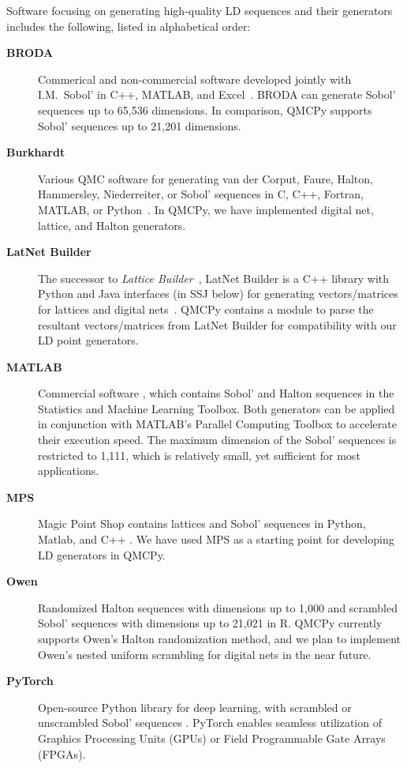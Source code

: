 \documentclass[graybox]{svmult}
\begin{document}
Software focusing on generating high-quality LD sequences and their generators includes the following, listed in alphabetical order:
\begin{description}%
	\item[\textbf{BRODA}] \sloppypar Commerical and non-commercial software developed jointly with I.M.~Sobol' in C++, MATLAB, and Excel~\cite{BRODA20a}. BRODA can generate Sobol' sequences up to 65,536 dimensions. In comparison, QMCPy supports Sobol' sequences up to 21,201 dimensions.	
	\item[\textbf{Burkhardt}] Various QMC software for generating van der Corput, Faure, Halton, Hammersley,  Niederreiter, or Sobol' sequences in C, C++, Fortran, MATLAB, or Python~\cite{Bur20a}. In QMCPy, we have implemented digital net, lattice, and Halton generators.
	\item[\textbf{LatNet Builder}] The successor to \emph{Lattice Builder}~\cite{LEcMun14a}, LatNet Builder is a C++ library with Python and Java interfaces (in SSJ below) for generating vectors/matrices for lattices and digital nets~\cite{LatNet,LEcEtal22a}. QMCPy contains a module to parse the resultant vectors/matrices from LatNet Builder for compatibility with our LD point generators. %
	\item[\textbf{MATLAB}] Commercial software \cite{MAT9.10}, which contains Sobol' and Halton sequences in the Statistics and Machine Learning Toolbox. Both generators can be applied in conjunction with MATLAB's Parallel Computing Toolbox to accelerate their execution speed. The maximum dimension of the Sobol' sequences is restricted to 1,111, which is relatively small, yet sufficient for most applications. 
	\item[\textbf{MPS}] Magic Point Shop contains lattices and Sobol' sequences in Python, Matlab, and C++ \cite{Nuy17a}. We have used MPS as a starting point for developing LD generators in QMCPy.
	\item[\textbf{Owen}] Randomized Halton sequences with dimensions up to 1,000 \cite{Owe20a} and scrambled Sobol' sequences with dimensions up to 21,021  \cite{owen1998scrambling, owen2021r}  in R. QMCPy currently supports Owen's Halton randomization method, and we plan to implement Owen's nested uniform scrambling for digital nets in the near future.
	\item[\textbf{PyTorch}] Open-source Python library for deep learning, with scrambled or unscrambled Sobol' sequences \cite{NEURIPS2019_9015,PyTorch}. PyTorch enables seamless utilization of Graphics Processing Units (GPUs) or Field Programmable Gate Arrays (FPGAs).

\end{description}
\end{document}
